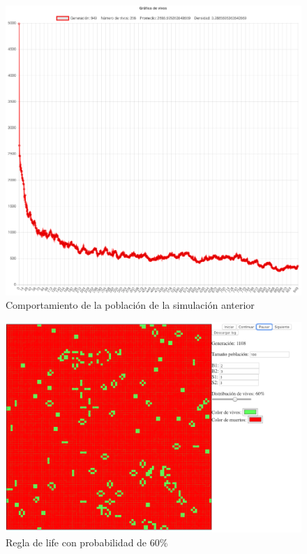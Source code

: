 	\begin{figure}[H]
		\begin{center}
			\includegraphics[scale=.24]{GOL/img/life50-2.png}
			\caption{Comportamiento de la población de la simulación anterior}
			\label{fig:gol5}
		\end{center}
	\end{figure}

	\begin{figure}[H]
		\begin{center}
			\includegraphics[scale=.3]{GOL/img/life60-1.png}
			\caption{Regla de life con probabilidad de 60\%}
			\label{fig:gol5}
		\end{center}
	\end{figure}

